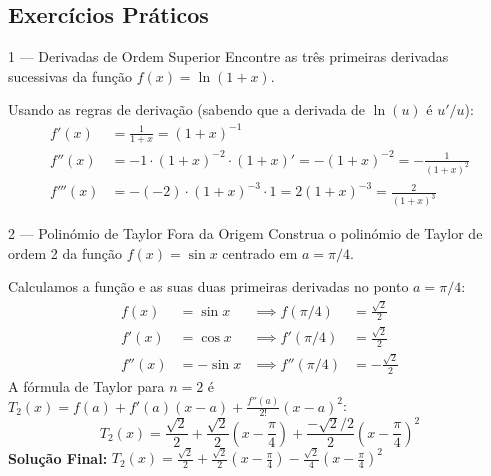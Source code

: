 \subsection{Exercícios Práticos}

\begin{exercisebox}{1 --- Derivadas de Ordem Superior}
  Encontre as três primeiras derivadas sucessivas da função $f(x)=\ln(1+x)$.
\end{exercisebox}
\begin{solbox}
  Usando as regras de derivação (sabendo que a derivada de $\ln(u)$ é $u'/u$):
  \begin{align*}
      f'(x) &= \frac{1}{1+x} = (1+x)^{-1} \\[1ex]
      f''(x) &= -1 \cdot (1+x)^{-2} \cdot (1+x)' = -(1+x)^{-2} = -\frac{1}{(1+x)^2} \\[1ex]
      f'''(x) &= -(-2) \cdot (1+x)^{-3} \cdot 1 = 2(1+x)^{-3} = \frac{2}{(1+x)^3}
  \end{align*}
\end{solbox}

\begin{exercisebox}{2 --- Polinómio de Taylor Fora da Origem}
  Construa o polinómio de Taylor de ordem 2 da função $f(x) = \sin x$ centrado em $a=\pi/4$.
\end{exercisebox}
\begin{solbox}
  Calculamos a função e as suas duas primeiras derivadas no ponto $a = \pi/4$:
  \begin{align*}
      f(x) &= \sin x & \implies f(\pi/4) &= \frac{\sqrt{2}}{2} \\
      f'(x) &= \cos x & \implies f'(\pi/4) &= \frac{\sqrt{2}}{2} \\
      f''(x) &= -\sin x & \implies f''(\pi/4) &= -\frac{\sqrt{2}}{2}
  \end{align*}
  A fórmula de Taylor para $n=2$ é $T_2(x) = f(a) + f'(a)(x-a) + \frac{f''(a)}{2!}(x-a)^2$:
  \[
    T_2(x) = \frac{\sqrt{2}}{2} + \frac{\sqrt{2}}{2}\left(x-\frac{\pi}{4}\right) + \frac{-\sqrt{2}/2}{2}\left(x-\frac{\pi}{4}\right)^2
  \]
  \textbf{Solução Final:} $\boxed{T_2(x) = \frac{\sqrt{2}}{2} + \frac{\sqrt{2}}{2}\left(x-\frac{\pi}{4}\right) - \frac{\sqrt{2}}{4}\left(x-\frac{\pi}{4}\right)^2}$
\end{solbox}

